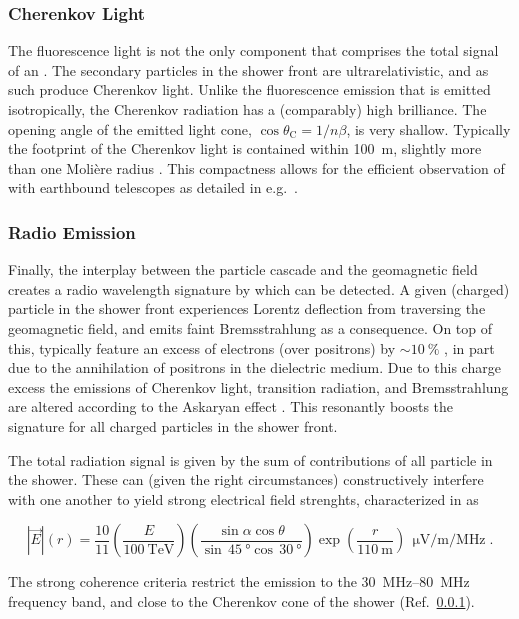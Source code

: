 \subsubsection{Cherenkov Light}
\label{sssec:cherenkov-light}

The fluorescence light is not the only component that comprises the total \UV 
signal of an \EAS. The secondary particles in the shower front are
ultrarelativistic, and as such produce Cherenkov light. Unlike the fluorescence
emission that is emitted isotropically, the Cherenkov radiation has a 
(comparably) high brilliance. The opening angle of the emitted \UV light cone, 
$\cos\theta_\mathrm{C} = 1 / n\beta$, is very shallow. Typically the footprint 
of the Cherenkov light is contained within \SI{100}{\meter}, slightly more than
one Molière radius \cite{nerlingDescriptionCherenkovLight2005, 
pierreaugercollaborationAtmosphericEffectsExtensive2009}. This compactness 
allows for the efficient observation of \EASs with earthbound \UV telescopes as
detailed in e.g.\ \cite{baixerasMAGICTelescope2003}.

\subsubsection{Radio Emission}
\label{sssec:radio-emission}

Finally, the interplay between the particle cascade and the geomagnetic field 
creates a radio wavelength signature by which \EASs can be detected. A given
(charged) particle in the shower front experiences Lorentz deflection from 
traversing the geomagnetic field, and emits faint Bremsstrahlung as a 
consequence. On top of this, \EASs typically feature an excess of electrons 
(over positrons) by $\sim\SI{10}{\percent}$
\cite{askaryanExcessNegativeCharge1961}, in part due to the annihilation of 
positrons in the dielectric medium. Due to this charge excess the emissions of 
Cherenkov light, transition radiation, and Bremsstrahlung are altered according
to the Askaryan effect \cite{askaryanExcessNegativeCharge1961}. This resonantly
boosts the \EM signature for all charged particles in the shower front.

The total radiation signal is given by the sum of contributions of all particle
in the shower. These can (given the right circumstances) constructively 
interfere with one another to yield strong electrical field strenghts, 
characterized in \cite{horandelRadioDetectionExtensive2019, 
allanProgressElementaryParticle1971} as

\begin{equation}
\label{eq:radio-ldf}
|\vec{E}|(r) = \frac{10}{11} \left(\frac{E}{\SI{100}{\tera\eV}}\right)\left(\frac{\sin\alpha\cos\theta}{\sin\,\SI{45}{\degree}\cos\,\SI{30}{\degree}} \right)\exp\left(\frac{r}{\SI{110}{\meter}}\right)\,\unit{\upmu\volt\per\meter\per\mega\hertz}.
\end{equation}

The strong coherence criteria restrict the emission to the 
\SIrange{30}{80}{\mega\hertz} frequency band, and close to the Cherenkov cone
of the shower (Ref.\ \cref{sssec:cherenkov-light}).
